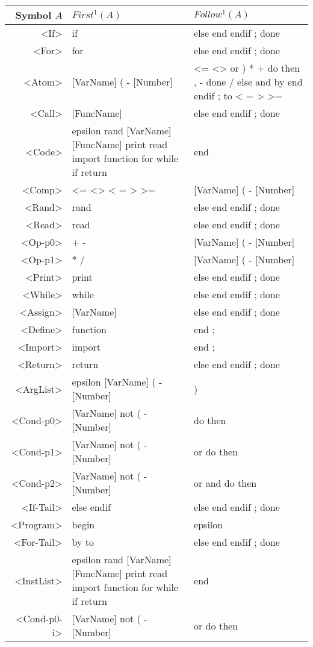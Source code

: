 \begin{longtable}{r p{7cm} p{7cm}}
\textnormal{Symbol} $A$ & $First^1(A)$ & $Follow^1(A)$\\ \hline
<If> & if  & else end endif ; done \\ \hline
<For> & for  & else end endif ; done \\ \hline
<Atom> & [VarName] ( - [Number]  & <= <> or ) * + do then , - done / else and by end endif ; to < = > >= \\ \hline
<Call> & [FuncName]  & else end endif ; done \\ \hline
<Code> & epsilon rand [VarName] [FuncName] print read import function for while if return  & end \\ \hline
<Comp> & <= <> < = > >=  & [VarName] ( - [Number] \\ \hline
<Rand> & rand  & else end endif ; done \\ \hline
<Read> & read  & else end endif ; done \\ \hline
<Op-p0> & + -  & [VarName] ( - [Number] \\ \hline
<Op-p1> & * /  & [VarName] ( - [Number] \\ \hline
<Print> & print  & else end endif ; done \\ \hline
<While> & while  & else end endif ; done \\ \hline
<Assign> & [VarName]  & else end endif ; done \\ \hline
<Define> & function  & end ; \\ \hline
<Import> & import  & end ; \\ \hline
<Return> & return  & else end endif ; done \\ \hline
<ArgList> & epsilon [VarName] ( - [Number]  & ) \\ \hline
<Cond-p0> & [VarName] not ( - [Number]  & do then \\ \hline
<Cond-p1> & [VarName] not ( - [Number]  & or do then \\ \hline
<Cond-p2> & [VarName] not ( - [Number]  & or and do then \\ \hline
<If-Tail> & else endif  & else end endif ; done \\ \hline
<Program> & begin  & epsilon \\ \hline
<For-Tail> & by to  & else end endif ; done \\ \hline
<InstList> & epsilon rand [VarName] [FuncName] print read import function for while if return  & end \\ \hline
<Cond-p0-i> & [VarName] not ( - [Number]  & or do then \\ \hline

\end{longtable}
